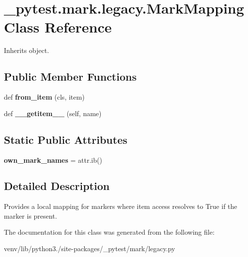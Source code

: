 \hypertarget{class__pytest_1_1mark_1_1legacy_1_1_mark_mapping}{}\section{\+\_\+pytest.\+mark.\+legacy.\+Mark\+Mapping Class Reference}
\label{class__pytest_1_1mark_1_1legacy_1_1_mark_mapping}


Inherits object.

\subsection*{Public Member Functions}
\begin{DoxyCompactItemize}
\item 
\mbox{\label{class__pytest_1_1mark_1_1legacy_1_1_mark_mapping_a0a2d93489bbc65e5e456752629ee1eb5}} 
def {\bfseries from\+\_\+item} (cls, item)
\item 
\mbox{\label{class__pytest_1_1mark_1_1legacy_1_1_mark_mapping_a480270e3232ba89559cbed6a02dc14d9}} 
def {\bfseries \+\_\+\+\_\+getitem\+\_\+\+\_\+} (self, name)
\end{DoxyCompactItemize}
\subsection*{Static Public Attributes}
\begin{DoxyCompactItemize}
\item 
\mbox{\label{class__pytest_1_1mark_1_1legacy_1_1_mark_mapping_aa4ef5a7567c40bccdabafa9fbe663f8e}} 
{\bfseries own\+\_\+mark\+\_\+names} = attr.\+ib()
\end{DoxyCompactItemize}


\subsection{Detailed Description}
\begin{DoxyVerb}Provides a local mapping for markers where item access
resolves to True if the marker is present. \end{DoxyVerb}
 

The documentation for this class was generated from the following file\+:\begin{DoxyCompactItemize}
\item 
venv/lib/python3./site-\/packages/\+\_\+pytest/mark/legacy.\+py\end{DoxyCompactItemize}
